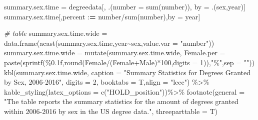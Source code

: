 \documentclass[
  12pt,
]{article}
\newenvironment{Shaded}{\begin{snugshade}}{\end{snugshade}}
\newcommand{\AttributeTok}[1]{\textcolor[rgb]{0.77,0.63,0.00}{#1}}
\newcommand{\CommentTok}[1]{\textcolor[rgb]{0.56,0.35,0.01}{\textit{#1}}}
\newcommand{\DecValTok}[1]{\textcolor[rgb]{0.00,0.00,0.81}{#1}}
\newcommand{\ErrorTok}[1]{\textcolor[rgb]{0.64,0.00,0.00}{\textbf{#1}}}
\newcommand{\FunctionTok}[1]{\textcolor[rgb]{0.00,0.00,0.00}{#1}}
\newcommand{\NormalTok}[1]{#1}
\newcommand{\OtherTok}[1]{\textcolor[rgb]{0.56,0.35,0.01}{#1}}
\newcommand{\SpecialCharTok}[1]{\textcolor[rgb]{0.00,0.00,0.00}{#1}}
\newcommand{\StringTok}[1]{\textcolor[rgb]{0.31,0.60,0.02}{#1}}
\begin{document}
\begin{Shaded}
\begin{Highlighting}[]
\NormalTok{summary.sex.time }\OtherTok{=}\NormalTok{ degreedata[,}
\NormalTok{                          .(}\AttributeTok{number =} \FunctionTok{sum}\NormalTok{(number)),}
\NormalTok{                          by }\OtherTok{=}\NormalTok{ .(sex,year)]}
\NormalTok{summary.sex.time[,percent }\SpecialCharTok{:}\ErrorTok{=}\NormalTok{ number}\SpecialCharTok{/}\FunctionTok{sum}\NormalTok{(number),by }\OtherTok{=}\NormalTok{ year]}

\CommentTok{\# table}
\NormalTok{summary.sex.time.wide }\OtherTok{=} \FunctionTok{data.frame}\NormalTok{(}\FunctionTok{acast}\NormalTok{(summary.sex.time,year}\SpecialCharTok{\textasciitilde{}}\NormalTok{sex,}\AttributeTok{value.var =} \StringTok{"number"}\NormalTok{))}
\NormalTok{summary.sex.time.wide }\OtherTok{=} \FunctionTok{mutate}\NormalTok{(summary.sex.time.wide,}
                                      \AttributeTok{Female.per =} \FunctionTok{paste}\NormalTok{(}\FunctionTok{sprintf}\NormalTok{(}\StringTok{\textquotesingle{}\%0.1f\textquotesingle{}}\NormalTok{,}\FunctionTok{round}\NormalTok{(Female}\SpecialCharTok{/}\NormalTok{(Female}\SpecialCharTok{+}\NormalTok{Male)}\SpecialCharTok{*}\DecValTok{100}\NormalTok{,}\AttributeTok{digits =} \DecValTok{1}\NormalTok{)),}\StringTok{"\%"}\NormalTok{,}\AttributeTok{sep =} \StringTok{""}\NormalTok{))}
\FunctionTok{kbl}\NormalTok{(summary.sex.time.wide, }\AttributeTok{caption =} \StringTok{"Summary Statistics for Degrees Granted by Sex, 2006{-}2016"}\NormalTok{, }\AttributeTok{digits =} \DecValTok{2}\NormalTok{, }\AttributeTok{booktabs =}\NormalTok{ T,}\AttributeTok{align =} \StringTok{"lccc"}\NormalTok{) }\SpecialCharTok{\%\textgreater{}\%}
  \FunctionTok{kable\_styling}\NormalTok{(}\AttributeTok{latex\_options =} \FunctionTok{c}\NormalTok{(}\StringTok{"HOLD\_position"}\NormalTok{))}\SpecialCharTok{\%\textgreater{}\%}
   \FunctionTok{footnote}\NormalTok{(}\AttributeTok{general =} \StringTok{"The table reports the summary statistics for the amount of degrees granted within 2006{-}2016 by sex in the US degree data."}\NormalTok{,}
            \AttributeTok{threeparttable =}\NormalTok{ T)}
\end{Highlighting}
\end{Shaded}
\end{document}
